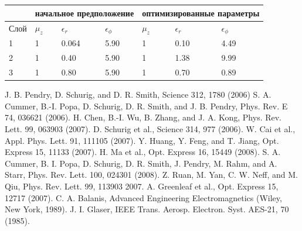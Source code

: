 \documentclass[a4paper, 12pt]{article}
\begin{document}
\begin{table}[h]
\begin{tabular}{lllllll}
\hline
\multicolumn{1}{|l}{}     & \multicolumn{3}{|l}{начальное предположение}                                                            & \multicolumn{3}{|l|}{оптимизированные параметры}                                                         \\ \hline
\multicolumn{1}{|l}{Слой} & \multicolumn{1}{|l}{$\mu_z$} & \multicolumn{1}{|l}{$\epsilon_r$} & \multicolumn{1}{|l}{$\epsilon_\phi$} & \multicolumn{1}{|l}{$\mu_z$} & \multicolumn{1}{|l}{$\epsilon_r$} & \multicolumn{1}{|l|}{$\epsilon_\phi$} \\ \hline
\multicolumn{1}{|l}{1}    & \multicolumn{1}{|l}{1}       & \multicolumn{1}{|l}{0.064}        & \multicolumn{1}{|l}{5.90}            & \multicolumn{1}{|l}{1}       & \multicolumn{1}{|l}{0.10}         & \multicolumn{1}{|l|}{4.49}            \\ \hline
\multicolumn{1}{|l}{2}    & \multicolumn{1}{|l}{1}       & \multicolumn{1}{|l}{0.40}         & \multicolumn{1}{|l}{5.90}            & \multicolumn{1}{|l}{1}       & \multicolumn{1}{|l}{1.38}         & \multicolumn{1}{|l|}{9.99}            \\ \hline
\multicolumn{1}{|l}{3}    & \multicolumn{1}{|l}{1}       & \multicolumn{1}{|l}{0.80}         & \multicolumn{1}{|l}{5.90}            & \multicolumn{1}{|l}{1}       & \multicolumn{1}{|l}{0.70}         & \multicolumn{1}{|l|}{0.89}            \\ \hline
\end{tabular}
\end{table}
\begin{thebibliography}{99}
J. B. Pendry, D. Schurig, and D. R. Smith, Science 312, 1780 (2006)
S. A. Cummer, B.-I. Popa, D. Schurig, D. R. Smith, and J. B. Pendry, Phys. Rev. E 74, 036621 (2006).
H. Chen, B.-I. Wu, B. Zhang, and J. A. Kong, Phys. Rev. Lett. 99, 063903 (2007).
D. Schurig et al., Science 314, 977 (2006).
W. Cai et al., Appl. Phys. Lett. 91, 111105 (2007).
Y. Huang, Y. Feng, and T. Jiang, Opt. Express 15, 11133
(2007).
H. Ma et al., Opt. Express 16, 15449 (2008).
S. A. Cummer, B. I. Popa, D. Schurig, D. R. Smith, J. Pendry, M. Rahm, and A. Starr, Phys. Rev. Lett. 100, 024301 (2008).
Z. Ruan, M. Yan, C. W. Neff, and M. Qiu, Phys. Rev. Lett. 99,
113903 2007.
A. Greenleaf et al., Opt. Express 15, 12717 (2007).
C. A. Balanis, Advanced Engineering Electromagnetics
(Wiley, New York, 1989).
J. I. Glaser, IEEE Trans. Aerosp. Electron. Syst. AES-21, 70
(1985).
\end{thebibliography}
\end{document}
